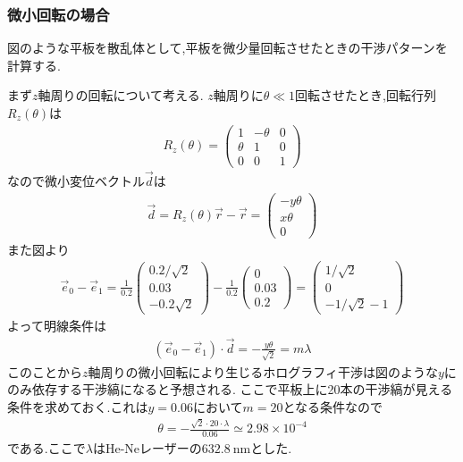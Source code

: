 \subsubsection{微小回転の場合}
図のような平板を散乱体として,平板を微少量回転させたときの干渉パターンを計算する.

まず$z$軸周りの回転について考える.
$z$軸周りに$\theta\ll 1$回転させたとき,回転行列$R_z(\theta)$は
\begin{align}
  R_z(\theta)=
  \left(\begin{array}{ccc}
    1&-\theta&0\\
    \theta&1&0\\
    0&0&1
  \end{array}\right)
\end{align}
なので微小変位ベクトル$\vec{d}$は
\begin{align}
  \vec{d}=R_z(\theta)\vec{r}-\vec{r}=\left(\begin{array}{c}
    -y\theta\\x\theta\\0    
  \end{array}\right)
\end{align}
また図より
\begin{align}
  \vec{e}_0-\vec{e}_1=\frac{1}{0.2}
  \left(\begin{array}{c}
    0.2/\sqrt{2}\\0.03\\-0.2\sqrt{2}  
  \end{array}\right)-\frac{1}{0.2}\left(\begin{array}{c}
    0\\0.03\\0.2
  \end{array}\right)=\left(\begin{array}{c}
    1/\sqrt{2}\\0\\-1/\sqrt{2}-1
  \end{array}\right)
\end{align}
よって明線条件は
\begin{align}
  (\vec{e}_0-\vec{e}_1)\cdot\vec{d}=-\frac{y\theta}{\sqrt{2}}=m\lambda
\end{align}
このことから$z$軸周りの微小回転により生じるホログラフィ干渉は図のような$y$にのみ依存する干渉縞になると予想される.
ここで平板上に20本の干渉縞が見える条件を求めておく.これは$y=0.06$において$m=20$となる条件なので
\begin{align}
  \theta=-\frac{\sqrt{2}\cdot20\cdot\lambda}{0.06}\simeq2.98\times10^{-4}
\end{align}
である.ここで$\lambda$はHe-Neレーザーの$632.8\ \si{\nano\metre}$とした.


